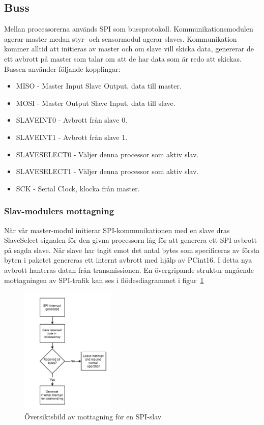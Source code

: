 \documentclass[a4paper,12pt,fleqn]{article}
\begin{document}
\subsection{Buss}
Mellan processorerna används SPI som bussprotokoll. Kommunikationsmodulen agerar master medan styr- och sensormodul agerar slaves. Kommunikation kommer alltid att initieras av master och om slave vill skicka data, genererar de ett avbrott på master som talar om att de har data som är redo att skickas. Bussen använder följande kopplingar:
\begin{itemize}
	\item MISO - Master Input Slave Output, data till master.
	\item MOSI - Master Output Slave Input, data till slave.
	\item SLAVEINT0 - Avbrott från slave 0.
	\item SLAVEINT1 - Avbrott från slave 1.
	\item SLAVESELECT0 - Väljer denna processor som aktiv slav.
	\item SLAVESELECT1 - Väljer denna processor som aktiv slav.
	\item SCK - Serial Clock, klocka från master.
\end{itemize}

\subsubsection{Slav-modulers mottagning}
När vår master-modul initierar SPI-kommunikationen med en slave dras SlaveSelect-signalen för den givna processorn låg för att generera ett SPI-avbrott på sagda slave. När slave har tagit emot det antal bytes som specificeras av första byten i paketet genereras ett internt avbrott med hjälp av PCint16. I detta nya avbrott hanteras datan från transmissionen. En övergripande struktur angående mottagningen av SPI-trafik kan ses i flödesdiagrammet i figur~\ref{fig:spislave}

\begin{figure}[htp] %
  \begin{center}
  \includegraphics[keepaspectratio=true,width=0.4\textwidth]{bilder/spislaverec.jpg}  %
  \end{center}
  \caption{Översiktsbild av mottagning för en SPI-slav} %
  \label{fig:spislave}
\end{figure}
\end{document}
